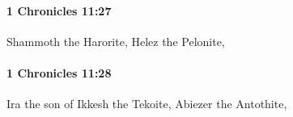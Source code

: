 		\paragraph{1 Chronicles 11:27} %
			\label{1CHRONICLES-11-27}

			Shammoth the Harorite, Helez the Pelonite,


		\paragraph{1 Chronicles 11:28} %
			\label{1CHRONICLES-11-28}

			Ira the son of Ikkesh the Tekoite, Abiezer the Antothite,


